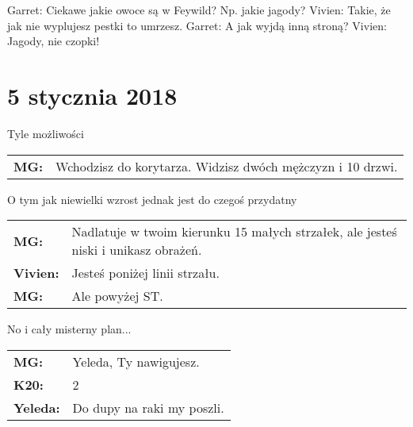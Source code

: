 \documentclass[10pt,twoside,twocolumn]{book}
\begin{document}
%    
%       
Garret: Ciekawe jakie owoce są w Feywild? Np. jakie jagody?
Vivien: Takie, że jak nie wyplujesz pestki to umrzesz.
Garret: A jak wyjdą inną stroną?
Vivien: Jagody, nie czopki!

\section*{5 stycznia 2018}

\begin{rpg-quotebox}{Tyle możliwości}
   \begin{tabularx}{\columnwidth}{lX}
      \textbf{MG:} & Wchodzisz do korytarza. Widzisz dwóch mężczyzn i 10 drzwi.\\
   \end{tabularx}
\end{rpg-quotebox}

\begin{rpg-quotebox}{O tym jak niewielki wzrost jednak jest do czegoś przydatny}
   \begin{tabularx}{\columnwidth}{lX}
      \textbf{MG:} & Nadlatuje w twoim kierunku 15 małych strzałek, ale jesteś niski i unikasz obrażeń.\\
      \textbf{Vivien:} & Jesteś poniżej linii strzału.\\
      \textbf{MG:} & Ale powyżej ST.\\
   \end{tabularx}
\end{rpg-quotebox}

\begin{rpg-quotebox}{No i cały misterny plan...}
   \begin{tabularx}{\columnwidth}{lX}
      \textbf{MG:} & Yeleda, Ty nawigujesz.\\
      \textbf{K20:} & 2\\
      \textbf{Yeleda:} & Do dupy na raki my poszli.\\
   \end{tabularx}
\end{rpg-quotebox}
\end{document}
